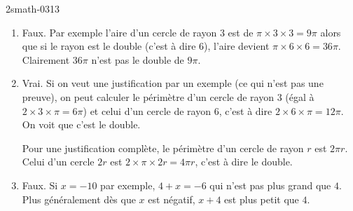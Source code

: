 
\begin{corrige}{2smath-0313}

    \begin{enumerate}
        \item
            Faux. Par exemple l'aire d'un cercle de rayon \( 3\) est de \( \pi\times 3\times 3=9\pi\) alors que si le rayon est le double (c'est à dire \( 6\)), l'aire devient \( \pi\times 6\times 6=36\pi\). Clairement \( 36\pi\) n'est pas le double de \( 9\pi\).
        \item
            Vrai. Si on veut une justification par un exemple (ce qui n'est pas une preuve), on peut calculer le périmètre d'un cercle de rayon \( 3\) (égal à \( 2\times 3\times\pi=6\pi\)) et celui d'un cercle de rayon \( 6\), c'est à dire \( 2\times 6\times \pi=12\pi\). On voit que c'est le double.

            Pour une justification complète, le périmètre d'un cercle de rayon \( r\) est \( 2\pi r\). Celui d'un cercle \( 2r\) est \( 2\times \pi\times 2r=4\pi r\), c'est à dire le double.
            
        \item
            Faux. Si \( x=-10\) par exemple, \( 4+x=-6\) qui n'est pas plus grand que \( 4\). Plus généralement dès que \( x\) est négatif, \( x+4\) est plus petit que \( 4\).
    \end{enumerate}

\end{corrige}
